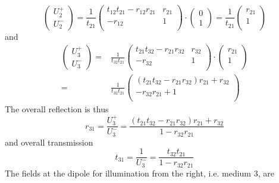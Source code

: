 \begin{equation}
\begin{pmatrix}
U_2^+ \\ U_2^-
\end{pmatrix}
=
\frac{1}{t_{21}}
\begin{pmatrix}
t_{12} t_{21} - r_{12}r_{21} & r_{21} \\ - r_{12} & 1 \\
\end{pmatrix} 
\cdot
\begin{pmatrix}
0 \\ 1
\end{pmatrix}
= 
\frac{1}{t_{21}}
\begin{pmatrix}
 r_{21} \\  1 \\
\end{pmatrix} 
\end{equation}
and 
\begin{align}
\begin{pmatrix}
U_3^+ \\ U_3^-
\end{pmatrix}
= & 
\frac{1}{t_{32} t_{21} }
\begin{pmatrix}
t_{21} t_{32} - r_{21}r_{32} & r_{32} \\ - r_{32} & 1 \\
\end{pmatrix} 
\cdot
\begin{pmatrix}
 r_{21} \\  1 \\
\end{pmatrix}  \\
= & 
\frac{1}{t_{32} t_{21} }
\begin{pmatrix}
(t_{21} t_{32} - r_{21}r_{32})  r_{21} +  r_{32} \\ - r_{32}  r_{21}  + 1 \\
\end{pmatrix} 
\end{align}
The overall reflection is thus
\begin{equation}
 r_{31} = \frac{U_3^+}{U_3^-}
 = \frac{(t_{21} t_{32} - r_{21}r_{32})  r_{21} +  r_{32}}{1 -r_{32}  r_{21}  }
\end{equation}
and overall transmission 
\begin{equation}
 t_{31} = \frac{1}{U_3^-}
 = \frac{t_{32} t_{21}  }{1 -r_{32}  r_{21}  }
\end{equation}
The fields at the dipole for illumination from the right, i.e. medium 3, are
